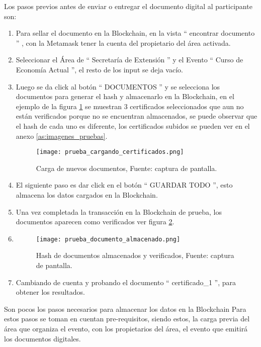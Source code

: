 Los pasos previos antes de  enviar o entregar el documento digital al participante son: 
\begin{enumerate}
  \item Para  sellar el documento en la Blockchain, en la vista “ encontrar documento ” , con la Metamask tener la cuenta del 
  propietario del área activada.
  \item Seleccionar el Área de “ Secretaría de Extensión ” y el Evento “ Curso de Economía Actual ”, el resto de los input se deja vacío.
  \item Luego se da click al botón “ DOCUMENTOS ” y se selecciona los documentos para  generar el hash y almacenarlo en la Blockchain, en el ejemplo de la figura \ref{img:nuevos_certificados} se muestran 3 certificados seleccionados
  que aun no están verificados porque no se encuentran almacenados, se puede observar que el hash de cada uno es diferente, los certificados subidos 
  se pueden ver en el anexo \ref{as:imagenes_pruebas}.
  \begin{figure}[H]
    \centering
    {\texttt{[image: prueba\_cargando\_certificados.png]}}
    \caption{Carga de nuevos documentos,  Fuente: captura de pantalla. }
    \label{img:nuevos_certificados}
  \end{figure}
  \item  El siguiente paso es dar click en el botón “ GUARDAR TODO ”, esto almacena los datos cargados en la Blockchain.
  \item Una vez completada la transacción en la  Blockchain de prueba, los documentos aparecen como verificados ver figura \ref{img:prueba_almacenamiento}.
  \item \begin{figure}[H]
    \centering
    {\texttt{[image: prueba\_documento\_almacenado.png]}}
    \caption{Hash de documentos almacenados y verificados,  Fuente: captura de pantalla. }
    \label{img:prueba_almacenamiento}
  \end{figure}
  \item Cambiando de cuenta y probando el documento  “ certificado\_1 ”, para obtener los resultados. 
\end{enumerate}




Son pocos los pasos necesarios para almacenar los datos en la Blockchain
Para estos pasos se toman en cuentan pre-requisitos, siendo estos, 
la carga previa del área que organiza el evento, con los propietarios del área, 
el evento que emitirá los documentos digitales. 